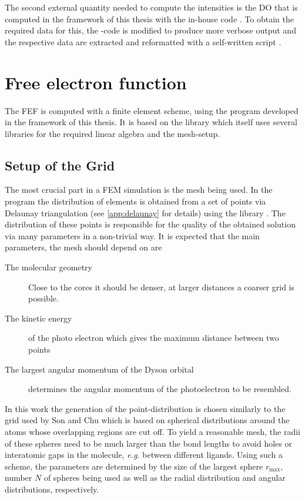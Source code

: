 The second external quantity needed to compute the intensities is the DO that is computed in the framework of this thesis with the in-house code  \cite{MAgg}.
To obtain the required data for this, the -code is modified to produce more verbose output and the respective data are extracted and reformatted with a self-written script \cite{nwc2dy}.

\section{Free electron function}
The FEF is computed with a finite element scheme, using the program  \cite{FreeWilly} developed in the framework of this thesis.
It is based on the library  \cite{libmesh} which itself uses several libraries for the required linear algebra and the mesh-setup.

\subsection{Setup of the Grid}
\label{sec:grid}
The most crucial part in a FEM simulation is the mesh being used. 
In the program  the distribution of elements is obtained from a set of points via Delaunay triangulation (see \ref{app:delaunay} for details) using the library  \cite{tetgen}.
The distribution of these points is responsible for the quality of the obtained solution via many parameters in a non-trivial way.
It is expected that the main parameters, the mesh should depend on are
\begin{description}
   \item[The molecular geometry] Close to the cores it should be denser, at larger distances a coarser grid is possible.
   \item[The kinetic energy] of the photo electron which gives the maximum distance between two points
   \item[The largest angular momentum of the Dyson orbital] determines the angular momentum of the photoelectron to be resembled.
\end{description}

In this work the generation of the point-distribution is chosen similarly to the grid used by Son and Chu \cite{Son_Chu} which is based on spherical distributions around the atoms whose overlapping regions are cut off.
To yield a reasonable mesh, the radii of these spheres need to be much larger than the bond lengths to avoid holes or interatomic gaps in the molecule, \textit{e.g.} between different ligands.
Using such a scheme, the parameters are determined by the size of the largest sphere $r_\text{max}$, number $N$ of spheres being used as well as the radial distribution and angular distributions, respectively.

